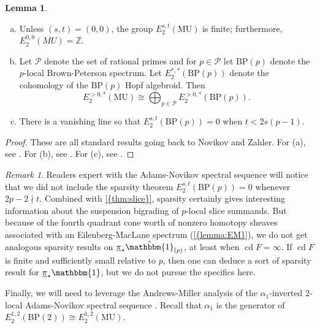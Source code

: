 \documentclass[10pt]{amsart}
\numberwithin{equation}{section}
\theoremstyle{plain}
\theoremstyle{definition}
\newtheorem{lemma}[lemma]{Lemma}
\theoremstyle{remark}
\newtheorem{remark}[remark]{Remark}
\begin{document}
\begin{lemma}\label{lemma:BPMU}
\begin{enumerate}[(a)]
\item Unless $(s,t) = (0,0)$, the group $E_2^{s,t}({\mathrm{MU}})$ is finite; furthermore, $E_2^{0,0}(MU) = {\mathbb{Z}}$.
\item Let $\mathscr{P}$ denote the set of rational primes and for $p\in \mathscr{P}$ let ${\mathrm{BP}}(p)$ denote the $p$-local Brown-Peterson spectrum.  Let $E_2^{*,*}({\mathrm{BP}}(p))$ denote the cohomology of the ${\mathrm{BP}}(p)$ Hopf algebroid.  Then
\[
  E_2^{>0,*}({\mathrm{MU}}) \cong \bigoplus_{p\in\mathscr{P}}E_2^{>0,*}({\mathrm{BP}}(p)).
\]
\item There is a vanishing line so that $E_2^{s,t}({\mathrm{BP}}(p)) = 0$ when $t<2s(p-1)$.
\end{enumerate}
\end{lemma}
\begin{proof}
These are all standard results going back to Novikov and Zahler.  For (a), see \cite[Proposition 2.1]{Novikov}.  For (b), see \cite[p.482]{Zahler}.  For (c), see \cite[Corollary 3.1]{Novikov}.
\end{proof}
\begin{remark}
Readers expert with the Adams-Novikov spectral sequence will notice that we did not include the sparsity theorem $E_2^{s,t}({\mathrm{BP}}(p)) = 0$ whenever $2p-2\nmid t$.  Combined with {\autoref{{thm:slice}}}, sparsity certainly gives interesting information about the suspension bigrading of $p$-local slice summands.  But because of the fourth quadrant cone worth of nonzero homotopy sheaves associated with an Eilenberg-MacLane spectrum ({\autoref{{lemma:EM}}}), we do not get analogous sparsity results on ${\underline{\smash{\pi}}}_\star \hat {\mathbbm{1}}_{(p)}$, at least when ${\operatorname{cd}} F = \infty$.  If ${\operatorname{cd}} F$ is finite and sufficiently small relative to $p$, then one can deduce a sort of sparsity result for ${\underline{\smash{\pi}}}_\star {\mathbbm{1}}$, but we do not pursue the specifics here.
\end{remark}

Finally, we will need to leverage the Andrews-Miller analysis of the $\alpha_1$-inverted $2$-local Adams-Novikov spectral sequence \cite{AM}.  Recall that $\alpha_1$ is the generator of $E_2^{1,2}({\mathrm{BP}}(2))\cong E_2^{1,2}({\mathrm{MU}})$.
\end{document}
